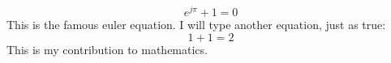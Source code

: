 \documentclass[a4paper]{article}
\begin{document}
\begin{equation}
	\label{eqn:euler}
	e^{j\pi} + 1 = 0
\end{equation}
This is the famous euler equation. I
will type another equation, just as
true:
\begin{equation}
	\label{eqn:simple}
	1 + 1 = 2
\end{equation}
This is my contribution to mathematics.
\end{document}
